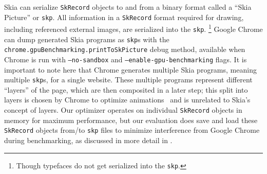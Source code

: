 \documentclass[main.tex]{subfiles}
\begin{document}
Skia can serialize \texttt{SkRecord} objects
  to and from a binary format called a ``Skia Picture'' or \texttt{skp}.
All information in a \texttt{SkRecord} format required for drawing,
  including referenced external images,
  are serialized into the \texttt{skp}.%
\footnote{
Though typefaces do not get serialized into the \texttt{skp}.
}
Google Chrome can dump generated Skia programs as \texttt{skp}s
  with the \texttt{chrome.gpuBenchmarking.printToSkPicture} debug method,
  available when Chrome is run with \texttt{--no-sandbox} and
  \texttt{--enable-gpu-benchmarking} flags.
It is important to note here that Chrome generates
  multiple Skia programs, meaning multiple \texttt{skp}s,
  for a single website.
These multiple programs represent different ``layers'' of the page,
  which are then composited in a later step;
  this split into layers is chosen by Chrome
  to optimize animations~\cite{wbe}
  and is unrelated to Skia's concept of layers.
Our optimizer operates on
  individual \texttt{SkRecord} objects in memory
  for maximum performance,
  but our evaluation does save and load
  these \texttt{SkRecord} objects from/to \texttt{skp} files
  to minimize interference from Google Chrome during benchmarking,
  as discussed in more detail in .
\end{document}
